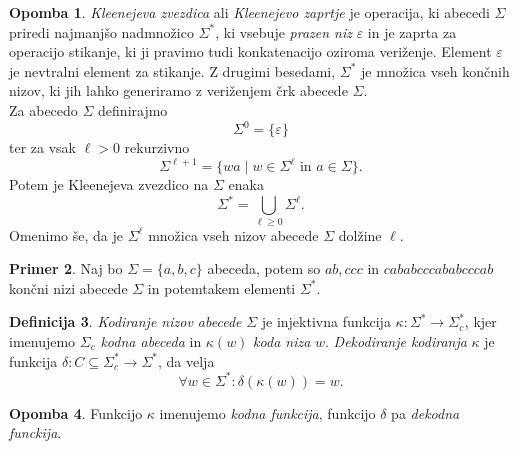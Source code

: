 \documentclass{amsart}
\theoremstyle{definition}
\newtheorem{definicija}{Definicija}[section]
\newtheorem{primer}[definicija]{Primer}
\newtheorem{opomba}[definicija]{Opomba}
\theoremstyle{plain} %
\begin{document}
\begin{opomba}
    
    \textit{Kleenejeva zvezdica} ali \textit{Kleenejevo zaprtje} je operacija, ki
    abecedi $ \Sigma $ priredi najmanjšo nadmnožico $ \Sigma^* $, ki vsebuje
    \textit{prazen niz} $ \varepsilon $ in je zaprta za operacijo stikanje, ki ji
    pravimo tudi konkatenacijo oziroma veriženje. Element $ \varepsilon $ je
    nevtralni element za stikanje. Z drugimi besedami, $ \Sigma^* $ je množica vseh
    končnih nizov, ki jih lahko generiramo z veriženjem črk abecede $ \Sigma $. \\
    Za abecedo $ \Sigma $ definirajmo
    \[
        \Sigma^0 = \{ \varepsilon \}
    \]
    ter za vsak $ \ell > 0 $ rekurzivno
    \[
        \Sigma^{\ell+1} = \{ wa \mid w \in \Sigma^{\ell} \text{ in } a \in \Sigma \}.
    \]
    Potem je Kleenejeva zvezdico na $ \Sigma $ enaka
    \[
        \Sigma^* = \bigcup_{\ell \geq 0} \Sigma^\ell.
    \]
    Omenimo še, da je $ \Sigma^{\ell} $ množica vseh nizov abecede $ \Sigma $ dolžine $ \ell $.

\end{opomba}

\begin{primer}
    
    Naj bo $ \Sigma = \{ a,b,c \} $ abeceda, potem so $ \mathit{ab}, \mathit{ccc} \text{ in }
    \mathit{cababcccababcccab} $ končni nizi abecede $ \Sigma $ in potemtakem elementi $ \Sigma^* $.

\end{primer}

\begin{definicija}
    
    \textit{Kodiranje nizov abecede} $ \Sigma $ je injektivna funkcija $ \kappa \colon \Sigma^* 
    \to \Sigma_c^* $, kjer imenujemo $ \Sigma_c $ \textit{kodna abeceda} in $ \kappa(w) $ 
    \textit{koda niza} $ w $. \textit{Dekodiranje kodiranja} $ \kappa $ je funkcija 
    $ \delta \colon C \subseteq \Sigma^*_c \to \Sigma^* $, da velja
    \[
        \forall w \in \Sigma^* \colon \delta(\kappa(w)) = w.
    \]

\end{definicija}

\begin{opomba}
    
    Funkcijo $ \kappa $ imenujemo \textit{kodna funkcija}, funkcijo $ \delta $ pa
    \textit{dekodna funckija}.

\end{opomba}
\end{document}
